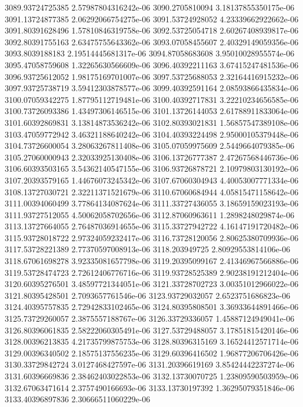 {3089.93724725385 2.57987804316242e-06
3090.2705810094 3.18137855350175e-06
3091.13724877385 2.06292066754275e-06
3091.53724928052 4.23339662922662e-06
3091.80391628496 1.57810846319758e-06
3092.53725054718 2.60267408939817e-06
3092.80391755163 2.63475755643362e-06
3093.07058455607 2.40329149059356e-06
3093.8039188183 2.19514445681317e-06
3094.87058683608 3.95010028955574e-06
3095.47058759608 1.32265630566609e-06
3096.40392211163 3.67415247481536e-06
3096.93725612052 1.98175169701007e-06
3097.53725688053 2.32164416915232e-06
3097.93725738719 3.59412303878577e-06
3099.40392591164 2.08593866435834e-06
3100.07059342275 1.87795112719481e-06
3100.40392717831 3.22210234656585e-06
3100.73726093386 1.43497306146515e-06
3101.13726144053 2.61788911833064e-06
3101.60392869831 3.13814873536242e-06
3102.80393021831 1.56857547389108e-06
3103.47059772942 3.46321188640242e-06
3104.40393224498 2.95000105379448e-06
3104.73726600054 3.28063267811408e-06
3105.07059975609 2.5449664079385e-06
3105.27060000943 2.32033925130408e-06
3106.13726777387 2.47267568446736e-06
3106.60393503165 3.54362140547155e-06
3106.93726878721 2.10979803130192e-06
3107.20393579165 1.44676073245342e-06
3107.67060304943 4.40053007771334e-06
3108.13727030721 2.32211371521679e-06
3110.67060684944 4.05815471158642e-06
3111.00394060499 3.77864134087624e-06
3111.33727436055 3.18659159023193e-06
3111.93727512055 4.50062058702656e-06
3112.87060963611 1.2898248029874e-06
3113.13727664055 2.76487036914655e-06
3115.33727942722 4.16147191720482e-06
3115.93728018722 2.97324059232417e-06
3116.73728120056 2.80625380709936e-06
3117.53728221389 2.77370597008913e-06
3118.203949725 2.80929553814106e-06
3118.67061698278 3.92335081657798e-06
3119.20395099167 2.41346967566886e-06
3119.53728474723 2.72612406776716e-06
3119.93728525389 2.90238191212404e-06
3120.60395276501 3.48597721344051e-06
3121.33728702723 3.00351012966022e-06
3121.80395428501 2.7093657761546e-06
3123.93729032057 2.6523751686823e-06
3124.40395757835 2.72942833102465e-06
3124.80395808501 3.36933644891466e-06
3125.73729260057 2.3875557188767e-06
3126.33729336057 1.45887124949041e-06
3126.80396061835 2.58222060305491e-06
3127.53729488057 3.17851815420146e-06
3128.00396213835 4.21735799875753e-06
3128.80396315169 3.16524412571714e-06
3129.00396340502 2.18575137556235e-06
3129.60396416502 1.96877206706426e-06
3130.33729842724 3.0127468427597e-06
3131.20396619169 3.85424442237274e-06
3131.60396669836 2.38462403022853e-06
3132.13730070725 1.23809590503959e-06
3132.67063471614 2.3757490166693e-06
3133.13730197392 1.36295079351846e-06
3133.40396897836 2.30666511060229e-06
}
